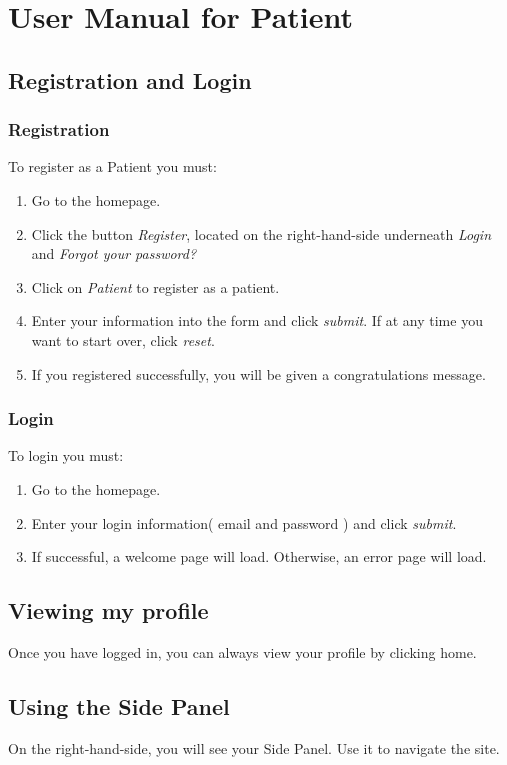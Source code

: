 \documentclass[10pt]{report}
\begin{document}
\chapter{User Manual for Patient}
\section{Registration and Login}
\subsection{Registration}
To register as a Patient you must:
\begin{enumerate}
\item Go to the homepage.
\item Click the button \textit{Register}, located on the right-hand-side underneath \textit{Login} and \textit{Forgot your password?}
\item Click on \textit{Patient} to register as a patient.
\item Enter your information into the form and click \textit{submit}. If at any time you want to start over, click \textit{reset}.
\item If you registered successfully, you will be given a congratulations message.
\end{enumerate}

\subsection{Login}
To login you must:
\begin{enumerate}
\item Go to the homepage.
\item Enter your login information( email and password ) and click \textit{submit}.
\item If successful, a welcome page will load. Otherwise, an error page will load. 
\end{enumerate}
\section{Viewing my profile}
Once you have logged in, you can always view your profile by clicking home.

\section{Using the Side Panel}
On the right-hand-side, you will see your Side Panel. Use it to navigate the site.
\end{document}
